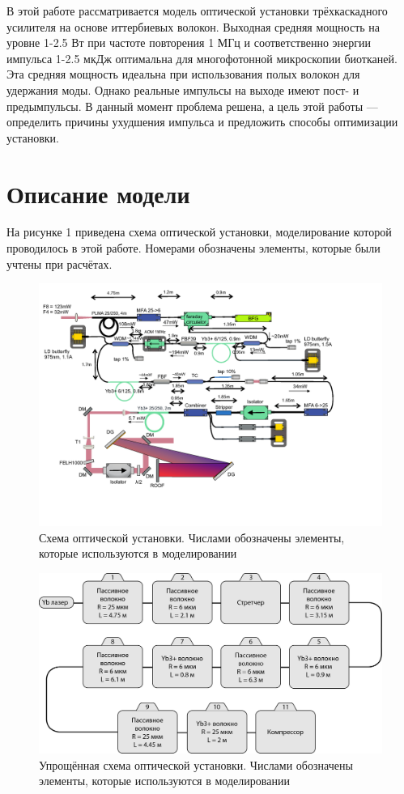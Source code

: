 \documentclass[12pt]{article}
\begin{document}
В этой работе рассматривается модель оптической установки трёхкаскадного усилителя на основе иттербиевых волокон.
Выходная средняя мощность на уровне 1-2.5 Вт при частоте повторения 1 МГц и соответственно энергии импульса 1-2.5 мкДж
оптимальна для многофотонной микроскопии биотканей. Эта средняя мощность идеальна при использования полых волокон для
удержания моды. Однако реальные импульсы на выходе имеют пост- и предымпульсы. В данный
момент проблема решена, а цель этой работы — определить причины ухудшения импульса и предложить способы оптимизации установки.

\clearpage
\section{Описание модели}

На рисунке 1 приведена схема оптической установки, моделирование которой проводилось в этой работе. Номерами
обозначены элементы, которые были учтены при расчётах.

\begin{figure}[h]
    \centering
    \includegraphics[trim=0 100 0 0, width=1\textwidth]{Images/YB_Amplifier_tech_data_sheme.png}
    \caption{Схема оптической установки. Числами обозначены элементы, которые используются в моделировании}
    \label{fig:rotated}
\end{figure}

\begin{figure}[h!]
    \centering
    \includegraphics[width=1\textwidth]{Images/Оптическая установка.png}
    \caption{Упрощённая схема оптической установки. Числами обозначены элементы, которые используются в моделировании}
    \label{fig:rotated}
\end{figure}
\end{document}
